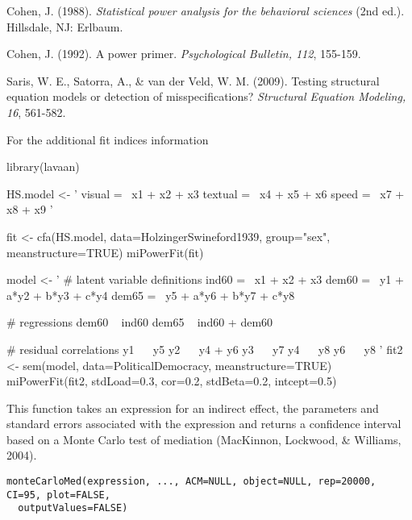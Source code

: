 \documentclass[a4paper]{book}
\begin{document}
%
\begin{References}\relax
Cohen, J. (1988). \emph{Statistical power analysis for the behavioral sciences} (2nd ed.). Hillsdale, NJ: Erlbaum.

Cohen, J. (1992). A power primer. \emph{Psychological Bulletin, 112}, 155-159.

Saris, W. E., Satorra, A., \& van der Veld, W. M. (2009). Testing structural equation models or detection of misspecifications? \emph{Structural Equation Modeling, 16}, 561-582.
\end{References}
%
\begin{SeeAlso}\relax
{} For the additional fit indices information
\end{SeeAlso}
%
\begin{Examples}
\begin{ExampleCode}
library(lavaan)

HS.model <- ' visual  =~ x1 + x2 + x3
              textual =~ x4 + x5 + x6
              speed   =~ x7 + x8 + x9 '

fit <- cfa(HS.model, data=HolzingerSwineford1939, group="sex", meanstructure=TRUE)
miPowerFit(fit)

model <- ' 
  # latent variable definitions
     ind60 =~ x1 + x2 + x3
     dem60 =~ y1 + a*y2 + b*y3 + c*y4
     dem65 =~ y5 + a*y6 + b*y7 + c*y8

  # regressions
    dem60 ~ ind60
    dem65 ~ ind60 + dem60

  # residual correlations
    y1 ~~ y5
    y2 ~~ y4 + y6
    y3 ~~ y7
    y4 ~~ y8
    y6 ~~ y8
'
fit2 <- sem(model, data=PoliticalDemocracy, meanstructure=TRUE)
miPowerFit(fit2, stdLoad=0.3, cor=0.2, stdBeta=0.2, intcept=0.5)
\end{ExampleCode}
\end{Examples}
%
\begin{Description}\relax
This function takes an expression for an indirect effect, the parameters and standard errors associated with the expression and returns a confidence interval based on a Monte Carlo test of mediation (MacKinnon, Lockwood, \& Williams, 2004).
\end{Description}
%
\begin{Usage}
\begin{verbatim}
monteCarloMed(expression, ..., ACM=NULL, object=NULL, rep=20000, CI=95, plot=FALSE, 
  outputValues=FALSE)
\end{verbatim}
\end{Usage}
\end{document}
